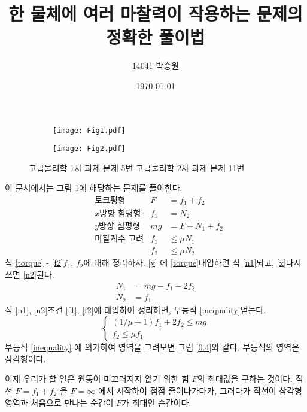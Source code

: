\documentclass[11pt]{article}
\title{한 물체에 여러 마찰력이 작용하는 문제의 정확한 풀이법}
\author{14041 박승원}
\date{\today}
\begin{document}
\maketitle
\begin{figure}[ht]
	\centering
	\begin{subfigure}[t]{.3\linewidth}
		\texttt{[image: Fig1.pdf]}
		\caption{\label{fig:fig1}}
	\end{subfigure}%
	\begin{subfigure}[t]{.3\linewidth}
		\texttt{[image: Fig2.pdf]}
		\caption{\label{fig:fig2}}
	\end{subfigure}
	\caption{ 고급물리학 1차 과제 문제 5번  고급물리학 2차 과제 문제 11번}
\end{figure}
이 문서에서는 그림 \ref{fig:fig1}에 해당하는 문제를 풀이한다.
\begin{align}
& \text{토크평형} & F&=f_{1}+f_{2} \label{torque} \\
& \text{$x$방향 힘평형} & f_{1}&=N_{2} \label{x} \\
& \text{$y$방향 힘평형} & mg&=F+N_{1}+f_{2} \label{y} \\
& \text{마찰계수 고려} & f_{1} &\leq \mu N_{1} \label{f1} \\
& & f_{2} &\leq \mu N_{2} \label{f2}
\end{align}
식 \eqref{torque} - \eqref{f2}\를 $ f_{1} $, $ f_{2} $에 대해 정리하자.
\eqref{y} 에 \eqref{torque}\를 대입하면 식 \eqref{n1}\이 되고, \eqref{x}\를 다시 쓰면 \eqref{n2}\가 된다.
\begin{align}
N_{1} &= mg-f_{1}-2f_{2} \label{n1} \\
N_{2} &= f_{1} \label{n2}
\end{align}
식 \eqref{n1}, \eqref{n2}\를 조건 \eqref{f1}, \eqref{f2}에 대입하여 정리하면, 부등식 \eqref{inequality}\를 얻는다.
\begin{equation} \label{inequality}
\begin{cases}
(1/\mu+1)f_{1}+2f_{2} \leq mg \\
f_{2} \leq \mu f_{1} 
\end{cases}
\end{equation}
부등식 \eqref{inequality} 에 의거하여 영역을 그려보면 그림 \ref{0.4}와 같다. 부등식의 영역은 삼각형이다.

이제 우리가 할 일은 원통이 미끄러지지 않기 위한 힘 $F$의 최대값을 구하는 것이다. 직선 $ F=f_{1}+f_{2} $ 을 $ F=\infty $ 에서 시작하여 점점 줄여나가다가, 그러다가 직선이 삼각형 영역과 처음으로 만나는 순간이 $ F $가 최대인 순간이다.
\end{document}
